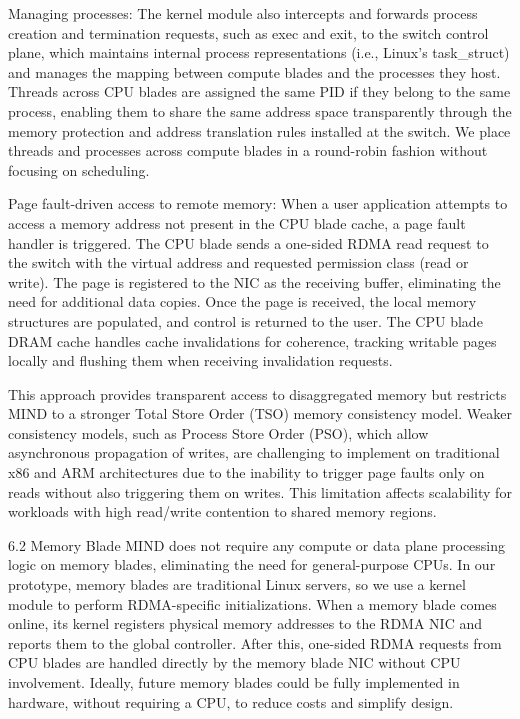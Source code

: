 Managing processes: The kernel module also intercepts and forwards process creation and termination requests, such as exec and exit, to the switch control plane, which maintains internal process representations (i.e., Linux’s task\_struct) and manages the mapping between compute blades and the processes they host. Threads across CPU blades are assigned the same PID if they belong to the same process, enabling them to share the same address space transparently through the memory protection and address translation rules installed at the switch. We place threads and processes across compute blades in a round-robin fashion without focusing on scheduling.

Page fault-driven access to remote memory: When a user application attempts to access a memory address not present in the CPU blade cache, a page fault handler is triggered. The CPU blade sends a one-sided RDMA read request to the switch with the virtual address and requested permission class (read or write). The page is registered to the NIC as the receiving buffer, eliminating the need for additional data copies. Once the page is received, the local memory structures are populated, and control is returned to the user. The CPU blade DRAM cache handles cache invalidations for coherence, tracking writable pages locally and flushing them when receiving invalidation requests.

This approach provides transparent access to disaggregated memory but restricts MIND to a stronger Total Store Order (TSO) memory consistency model. Weaker consistency models, such as Process Store Order (PSO), which allow asynchronous propagation of writes, are challenging to implement on traditional x86 and ARM architectures due to the inability to trigger page faults only on reads without also triggering them on writes. This limitation affects scalability for workloads with high read/write contention to shared memory regions.

6.2 Memory Blade
MIND does not require any compute or data plane processing logic on memory blades, eliminating the need for general-purpose CPUs. In our prototype, memory blades are traditional Linux servers, so we use a kernel module to perform RDMA-specific initializations. When a memory blade comes online, its kernel registers physical memory addresses to the RDMA NIC and reports them to the global controller. After this, one-sided RDMA requests from CPU blades are handled directly by the memory blade NIC without CPU involvement. Ideally, future memory blades could be fully implemented in hardware, without requiring a CPU, to reduce costs and simplify design.

